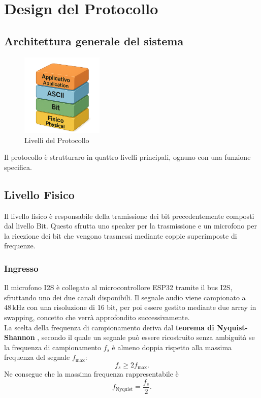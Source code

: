 \chapter{Design del Protocollo}
\label{chap:design_protocollo}
\section{Architettura generale del sistema}
\begin{figure}[H]
    \centering
    \includegraphics[width=0.35\textwidth]{immagini/layers.png}
    \caption{Livelli del Protocollo}
    \label{fig:esempio}
\end{figure}
Il protocollo è strutturaro in quattro livelli principali, ognuno con una funzione specifica.
\section{Livello Fisico}
Il livello fisico è responsabile della tramissione dei bit precedentemente composti dal livello Bit.
Questo sfrutta uno speaker per la trasmissione e un microfono per la ricezione dei bit che vengono trasmessi mediante coppie superimposte di frequenze.
\subsection{Ingresso}
Il microfono I2S è collegato al microcontrollore ESP32 tramite il bus I2S, sfruttando uno dei due canali disponibili.  
Il segnale audio viene campionato a $48\,\text{kHz}$ con una risoluzione di 16 bit, per poi essere gestito mediante due array in swapping, concetto che verrà approfondito successivamente. \\

\noindent
La scelta della frequenza di campionamento deriva dal \textbf{teorema di Nyquist-Shannon} \cite{shannon1949}, secondo il quale un segnale può essere ricostruito senza ambiguità se la frequenza di campionamento $f_s$ è almeno doppia rispetto alla massima frequenza del segnale $f_{\max}$:
\[
f_s \geq 2 f_{\max}.
\]
Ne consegue che la massima frequenza rappresentabile è
\[
f_{\text{Nyquist}} = \frac{f_s}{2}.
\]


